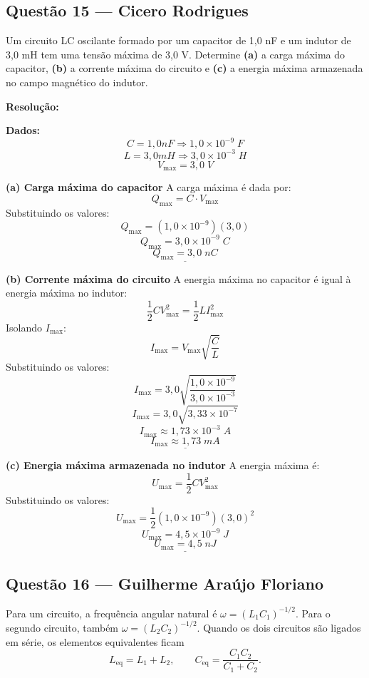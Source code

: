 \documentclass[12pt,a4paper]{article}
\begin{document}
\subsection{Questão 15 — Cicero Rodrigues}

\normalfont Um circuito LC oscilante formado por um capacitor de 1,0 nF e um indutor de 3,0 mH tem uma tensão máxima de 3,0 V. Determine \textbf{(a)} a carga máxima do capacitor, \textbf{(b)} a corrente máxima do circuito e \textbf{(c)} a energia máxima armazenada no campo magnético do indutor.

\textbf{Resolução:}
\vspace{0.3cm}

\textbf{Dados:}
\[C = 1,0 nF \Rightarrow 1,0 \times 10^{-9}\;F\]
\[L = 3,0 mH \Rightarrow 3,0 \times 10^{-3}\;H\]
\[V_{\max} = 3,0\;V\]

\vspace{0.2cm}
\textbf{(a) Carga máxima do capacitor}
A carga máxima é dada por:
\[Q_{\max} = C \cdot V_{\max}\]
Substituindo os valores:
\[Q_{\max} = (1,0 \times 10^{-9})(3,0)\]
\[Q_{\max} = 3,0 \times 10^{-9}\;C\]
\[\underline{Q_{\max} = 3,0\;nC}\]

\vspace{0.2cm}
\textbf{(b) Corrente máxima do circuito}
A energia máxima no capacitor é igual à energia máxima no indutor:
\[\frac{1}{2}CV_{\max}^{2} = \frac{1}{2}LI_{\max}^{2}\]
Isolando \(I_{\max}\):
\[I_{\max} = V_{\max}\sqrt{\frac{C}{L}}\]
Substituindo os valores:
\[I_{\max} = 3,0 \sqrt{\frac{1,0 \times 10^{-9}}{3,0 \times 10^{-3}}}\]
\[I_{\max} = 3,0 \sqrt{3,33 \times 10^{-7}}\]
\[I_{\max} \approx 1,73 \times 10^{-3}\;A\]
\[\underline{I_{\max} \approx 1,73\;mA}\]

\vspace{0.2cm}
\textbf{(c) Energia máxima armazenada no indutor}
A energia máxima é:
\[U_{\max} = \frac{1}{2}CV_{\max}^{2}\]
Substituindo os valores:
\[U_{\max} = \frac{1}{2}(1,0 \times 10^{-9})(3,0)^2\]
\[U_{\max} = 4,5 \times 10^{-9}\;J\]
\[\underline{U_{\max} = 4,5\;nJ}\]

\subsection{Questão 16 — Guilherme Araújo Floriano}

Para um circuito, a frequência angular natural é $\omega=(L_1C_1)^{-1/2}$. Para o segundo circuito, também $\omega=(L_2C_2)^{-1/2}$. Quando os dois circuitos são ligados em série, os elementos equivalentes ficam
\[
L_{\mathrm{eq}}=L_1+L_2,\qquad C_{\mathrm{eq}}=\frac{C_1C_2}{C_1+C_2}.
\]
\end{document}
